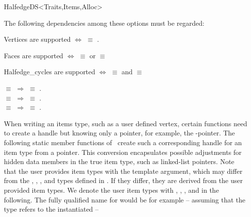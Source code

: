 \begin{ccRefConcept}{HalfedgeDS<Traits,Items,Alloc>}
\begin{ccAdvanced}
The following dependencies among these options must be regarded:

Vertices are supported $\Longleftrightarrow$
 $\equiv$ .

Faces are supported $\Longleftrightarrow$
 $\equiv$ 
or  $\equiv$ 

Halfedge\_cycles are supported $\Longleftrightarrow$
 $\equiv$ 
and  $\equiv$ 


 $\equiv$  $\Longrightarrow$
 $\equiv$ .
\\
 $\equiv$  $\Longrightarrow$
 $\equiv$ .
\\
 $\equiv$  $\Longrightarrow$
 $\equiv$ .


\end{ccAdvanced}

\begin{ccAdvanced}

When writing an items type, such as a user defined vertex, certain
functions need to create a handle but knowing only a pointer, for
example, the -pointer. The following static member functions
of \ccRefName\ create such a corresponding handle for an item type
from a pointer. This conversion encapsulates possible adjustments for
hidden data members in the true item type, such as linked-list
pointers. Note that the user provides item types with the
 template argument, which may differ from the ,
, , and  types defined in \ccRefName. If they 
differ, they are derived from the user provided item types. We denote the
user item types with , , 
, and  in the following. The fully qualified name for 
 would be for example -- assuming that the type 
refers to the instantiated  --


\end{ccAdvanced}
\end{ccRefConcept}
